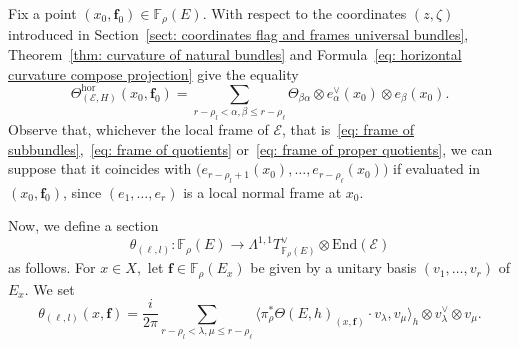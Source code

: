 \documentclass[a4paper]{amsart}
\theoremstyle{plain}%
\theoremstyle{definition}
\theoremstyle{remark}
\newcommand{\FF}{\mathbb{F}}
\begin{document}
Fix a point $ (x_0,\mathbf{f}_0) \in \FF_{\rho}(E) $.
With respect to the coordinates $ (z,\zeta) $ introduced in Section~\ref{sect: coordinates flag and frames universal bundles}, Theorem~\ref{thm: curvature of natural bundles} and Formula~\eqref{eq: horizontal curvature compose projection} give the equality
\begin{equation}\label{eq: curvature tensor of horizontal part}
	\Theta_{(\mathcal{E},H)}^{\operatorname{hor}}(x_0,\mathbf{f}_0) =
	\sum_{r-\rho_l < \alpha,\beta \le r-\rho_{\ell}} \Theta_{\beta \alpha} \otimes e_\alpha^{\vee}(x_0) \otimes e_\beta(x_0) .
\end{equation}
Observe that, whichever the local frame of $ \mathcal{E} $, that is~\eqref{eq: frame of subbundles},~\eqref{eq: frame of quotients} or~\eqref{eq: frame of proper quotients}, we can suppose that it coincides with $ \big( e_{r-\rho_l+1}(x_0),\dots,e_{r-\rho_\ell}(x_0) \big) $ if evaluated in $ (x_0,\mathbf{f}_0) $, since $ (e_1,\dots,e_r) $ is a local normal frame at $ x_0 $.

Now, we define a section
$$ \theta_{(\ell,l)} \colon \FF_{\rho}(E) \to {\Lambda}^{1,1}{T_{\FF_{\rho}(E)}^{\vee}} \otimes \operatorname{End(\mathcal{E})} $$
as follows.
For $ x \in X, $ let $ \mathbf{f} \in \FF_{\rho}(E_x) $ be given by a unitary basis $ (v_1,\dots,v_r) $ of $ E_x $.
We set
\begin{equation}\label{eq: horizontal curvature explicit}
	\theta_{(\ell,l)}(x,\mathbf{f}) = \frac{i}{2\pi} \sum_{r-\rho_l < \lambda,\mu \le r-\rho_{\ell}} \bigl\langle \pi_{\rho}^*\Theta(E,h)_{(x,\mathbf{f})}\cdot {v_\lambda}, {v_\mu} \bigr\rangle_h \otimes v_{\lambda}^{\vee} \otimes v_{\mu} . 
\end{equation}
\end{document}
